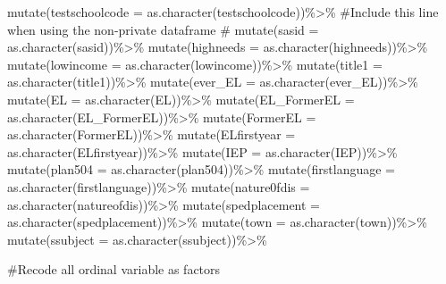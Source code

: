 \documentclass[
  letterpaper,
  DIV=11,
  numbers=noendperiod]{scrartcl}
\newenvironment{Shaded}{\begin{snugshade}}{\end{snugshade}}
\newcommand{\AttributeTok}[1]{\textcolor[rgb]{0.40,0.45,0.13}{#1}}
\newcommand{\CommentTok}[1]{\textcolor[rgb]{0.37,0.37,0.37}{#1}}
\newcommand{\FunctionTok}[1]{\textcolor[rgb]{0.28,0.35,0.67}{#1}}
\newcommand{\NormalTok}[1]{\textcolor[rgb]{0.00,0.23,0.31}{#1}}
\newcommand{\SpecialCharTok}[1]{\textcolor[rgb]{0.37,0.37,0.37}{#1}}
\begin{document}
\begin{Shaded}
\begin{Highlighting}[]
 
  \FunctionTok{mutate}\NormalTok{(}\AttributeTok{testschoolcode =} \FunctionTok{as.character}\NormalTok{(testschoolcode))}\SpecialCharTok{\%\textgreater{}\%}
  \CommentTok{\#Include this line when using the non{-}private dataframe}
  \CommentTok{\# mutate(sasid = as.character(sasid))\%\textgreater{}\%}
  \FunctionTok{mutate}\NormalTok{(}\AttributeTok{highneeds =} \FunctionTok{as.character}\NormalTok{(highneeds))}\SpecialCharTok{\%\textgreater{}\%}
  \FunctionTok{mutate}\NormalTok{(}\AttributeTok{lowincome =} \FunctionTok{as.character}\NormalTok{(lowincome))}\SpecialCharTok{\%\textgreater{}\%}
  \FunctionTok{mutate}\NormalTok{(}\AttributeTok{title1 =} \FunctionTok{as.character}\NormalTok{(title1))}\SpecialCharTok{\%\textgreater{}\%}
  \FunctionTok{mutate}\NormalTok{(}\AttributeTok{ever\_EL =} \FunctionTok{as.character}\NormalTok{(ever\_EL))}\SpecialCharTok{\%\textgreater{}\%}
  \FunctionTok{mutate}\NormalTok{(}\AttributeTok{EL =} \FunctionTok{as.character}\NormalTok{(EL))}\SpecialCharTok{\%\textgreater{}\%}
  \FunctionTok{mutate}\NormalTok{(}\AttributeTok{EL\_FormerEL =} \FunctionTok{as.character}\NormalTok{(EL\_FormerEL))}\SpecialCharTok{\%\textgreater{}\%}
  \FunctionTok{mutate}\NormalTok{(}\AttributeTok{FormerEL =} \FunctionTok{as.character}\NormalTok{(FormerEL))}\SpecialCharTok{\%\textgreater{}\%}
  \FunctionTok{mutate}\NormalTok{(}\AttributeTok{ELfirstyear =} \FunctionTok{as.character}\NormalTok{(ELfirstyear))}\SpecialCharTok{\%\textgreater{}\%}
  \FunctionTok{mutate}\NormalTok{(}\AttributeTok{IEP =} \FunctionTok{as.character}\NormalTok{(IEP))}\SpecialCharTok{\%\textgreater{}\%}
  \FunctionTok{mutate}\NormalTok{(}\AttributeTok{plan504 =} \FunctionTok{as.character}\NormalTok{(plan504))}\SpecialCharTok{\%\textgreater{}\%}
  \FunctionTok{mutate}\NormalTok{(}\AttributeTok{firstlanguage =} \FunctionTok{as.character}\NormalTok{(firstlanguage))}\SpecialCharTok{\%\textgreater{}\%}
  \FunctionTok{mutate}\NormalTok{(}\AttributeTok{nature0fdis =} \FunctionTok{as.character}\NormalTok{(natureofdis))}\SpecialCharTok{\%\textgreater{}\%}
  \FunctionTok{mutate}\NormalTok{(}\AttributeTok{spedplacement =} \FunctionTok{as.character}\NormalTok{(spedplacement))}\SpecialCharTok{\%\textgreater{}\%}
  \FunctionTok{mutate}\NormalTok{(}\AttributeTok{town =} \FunctionTok{as.character}\NormalTok{(town))}\SpecialCharTok{\%\textgreater{}\%}
  \FunctionTok{mutate}\NormalTok{(}\AttributeTok{ssubject =} \FunctionTok{as.character}\NormalTok{(ssubject))}\SpecialCharTok{\%\textgreater{}\%}


\CommentTok{\#Recode all ordinal variable as factors}


\end{Highlighting}
\end{Shaded}
\end{document}
